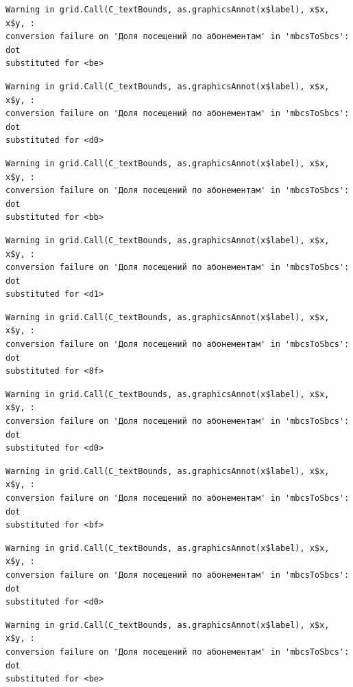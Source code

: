 \documentclass[
  letterpaper,
  DIV=11,
  numbers=noendperiod]{scrartcl}
\begin{document}
\begin{verbatim}
Warning in grid.Call(C_textBounds, as.graphicsAnnot(x$label), x$x, x$y, :
conversion failure on 'Доля посещений по абонементам' in 'mbcsToSbcs': dot
substituted for <be>
\end{verbatim}

\begin{verbatim}
Warning in grid.Call(C_textBounds, as.graphicsAnnot(x$label), x$x, x$y, :
conversion failure on 'Доля посещений по абонементам' in 'mbcsToSbcs': dot
substituted for <d0>
\end{verbatim}

\begin{verbatim}
Warning in grid.Call(C_textBounds, as.graphicsAnnot(x$label), x$x, x$y, :
conversion failure on 'Доля посещений по абонементам' in 'mbcsToSbcs': dot
substituted for <bb>
\end{verbatim}

\begin{verbatim}
Warning in grid.Call(C_textBounds, as.graphicsAnnot(x$label), x$x, x$y, :
conversion failure on 'Доля посещений по абонементам' in 'mbcsToSbcs': dot
substituted for <d1>
\end{verbatim}

\begin{verbatim}
Warning in grid.Call(C_textBounds, as.graphicsAnnot(x$label), x$x, x$y, :
conversion failure on 'Доля посещений по абонементам' in 'mbcsToSbcs': dot
substituted for <8f>
\end{verbatim}

\begin{verbatim}
Warning in grid.Call(C_textBounds, as.graphicsAnnot(x$label), x$x, x$y, :
conversion failure on 'Доля посещений по абонементам' in 'mbcsToSbcs': dot
substituted for <d0>
\end{verbatim}

\begin{verbatim}
Warning in grid.Call(C_textBounds, as.graphicsAnnot(x$label), x$x, x$y, :
conversion failure on 'Доля посещений по абонементам' in 'mbcsToSbcs': dot
substituted for <bf>
\end{verbatim}

\begin{verbatim}
Warning in grid.Call(C_textBounds, as.graphicsAnnot(x$label), x$x, x$y, :
conversion failure on 'Доля посещений по абонементам' in 'mbcsToSbcs': dot
substituted for <d0>
\end{verbatim}

\begin{verbatim}
Warning in grid.Call(C_textBounds, as.graphicsAnnot(x$label), x$x, x$y, :
conversion failure on 'Доля посещений по абонементам' in 'mbcsToSbcs': dot
substituted for <be>
\end{verbatim}
\end{document}
